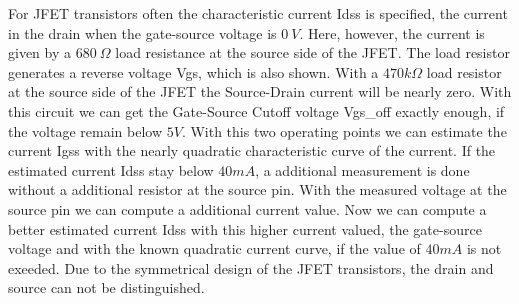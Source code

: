 For JFET transistors often the characteristic current Idss is specified,
the current in the drain when the gate-source voltage is \(0~V\).
Here, however, the current is given by a \(680~\Omega\) load resistance at the source side
of the JFET.
The load resistor generates a reverse voltage Vgs,
which is also shown.
With a \(470k\Omega\) load resistor at the source side of the JFET the Source-Drain current will
be nearly zero. With this circuit we can get the Gate-Source Cutoff voltage Vgs\_off exactly enough,
if the voltage remain below \(5V\).
With this two operating points we can estimate the current Igss with the nearly quadratic characteristic
curve of the current.
If the estimated current Idss stay below \(40mA\), a additional measurement is done without
a additional resistor at the source pin.
With the measured voltage at the source pin we can compute a additional current value.
Now we can compute a better estimated current Idss with this higher current valued, the gate-source voltage
and with the known quadratic current curve, if the value of \(40mA\) is not exeeded.
Due to the symmetrical design of the JFET transistors, the drain and source can not be distinguished.


